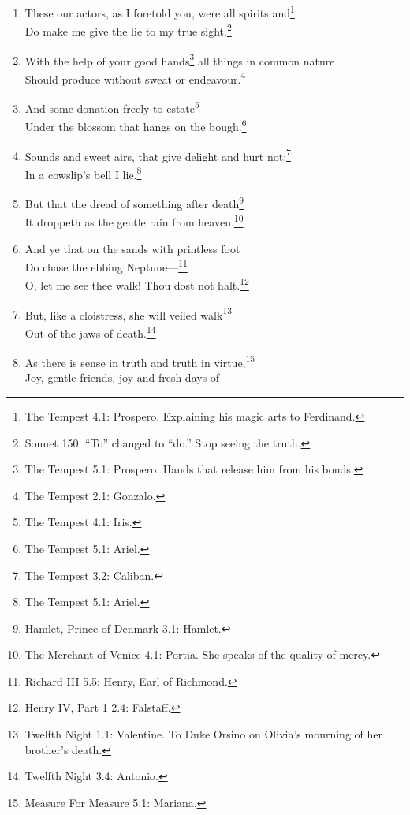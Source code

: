 \documentclass[17pt,twoside]{extarticle}
\begin{document}
\begin{enumerate}
{    Miranda. On seeing her betrothed Ferdinand's father Alonso and his
    retinue.}\\Merrily, merrily, shall I live now.\footnote{The Tempest
    5.1: Ariel. On learning he will soon be freed from his service to
    Prospero.}
\item
  These our actors, as I foretold you, were all spirits and\footnote{The
    Tempest 4.1: Prospero. Explaining his magic arts to Ferdinand.}\\Do
  make me give the lie to my true sight.\footnote{Sonnet 150. ``To''
    changed to ``do.'' Stop seeing the truth.}
\item
  With the help of your good hands\footnote{The Tempest 5.1: Prospero.
    Hands that release him from his bonds.} all things in common
  nature\\Should produce without sweat or endeavour.\footnote{The
    Tempest 2.1: Gonzalo.}
\item
  And some donation freely to estate\footnote{The Tempest 4.1: Iris.}\\Under
  the blossom that hangs on the bough.\footnote{The Tempest 5.1: Ariel.}
\item
  Sounds and sweet airs, that give delight and hurt not:\footnote{The
    Tempest 3.2: Caliban.}\\In a cowslip's bell I lie.\footnote{The
    Tempest 5.1: Ariel.}
\item
  But that the dread of something after death\footnote{Hamlet, Prince of
    Denmark 3.1: Hamlet.}\\It droppeth as the gentle rain from
  heaven.\footnote{The Merchant of Venice 4.1: Portia. She speaks of the
    quality of mercy.}
\item
  And ye that on the sands with printless foot\\Do chase the ebbing
  Neptune---\footnote{Richard III 5.5: Henry, Earl of Richmond.}\\O, let
  me see thee walk! Thou dost not halt.\footnote{Henry IV, Part 1 2.4:
    Falstaff.}
\item
  But, like a cloistress, she will veiled walk\footnote{Twelfth Night
    1.1: Valentine. To Duke Orsino on Olivia's mourning of her brother's
    death.}\\Out of the jaws of death.\footnote{Twelfth Night 3.4:
    Antonio.}
\item
  As there is sense in truth and truth in virtue,\footnote{Measure For
    Measure 5.1: Mariana.}\\Joy, gentle friends, joy and fresh days of

\end{enumerate}
\end{document}
